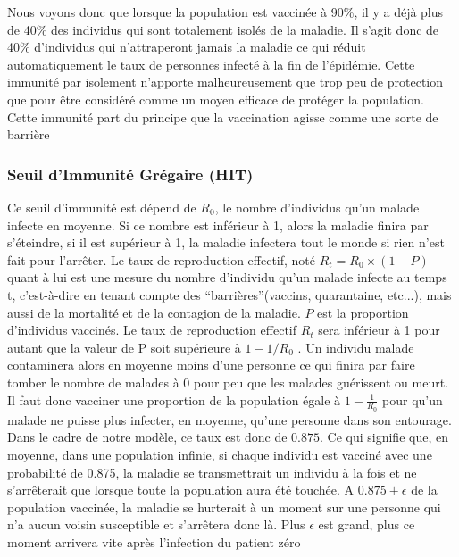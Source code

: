 \documentclass[journal, a4paper]{IEEEtran}
\begin{document}
	Nous voyons donc que lorsque la population est vaccinée à 90\%, il y a déjà plus de 40\% des individus qui sont totalement isolés de la maladie. Il s'agit donc de 40\% d'individus qui n'attraperont jamais la maladie ce qui réduit automatiquement le taux de personnes infecté à la fin de l'épidémie. Cette immunité par isolement n'apporte malheureusement que trop peu de protection que pour être considéré comme un moyen efficace de protéger la population. Cette immunité part du principe que la vaccination agisse comme une sorte de barrière \cite{vaccine_as_barrier}

	\subsubsection{Seuil d'Immunité Grégaire (HIT)}
	Ce seuil d'immunité est dépend de $R_0$, le nombre d'individus qu'un malade infecte en moyenne. Si ce nombre est inférieur à 1, alors la maladie finira par s'éteindre, si il est supérieur à 1, la maladie infectera tout le monde si rien n'est fait pour l'arrêter.
	Le taux de reproduction effectif, noté $R_t = R_0 \times (1-P)$ quant à lui est une mesure du nombre d'individu qu'un malade infecte au temps t, c'est-à-dire en tenant compte des ``barrières''(vaccins, quarantaine, etc...), mais aussi de la mortalité et de la contagion de la maladie. $P$ est la proportion d'individus vaccinés. Le taux de reproduction effectif $R_t$ sera inférieur à 1 pour autant que la valeur de P soit supérieure à $1-1/R_0$ \cite{herd_guide}. Un individu malade contaminera alors en moyenne moins d'une personne ce qui finira par faire tomber le nombre de malades à 0 pour peu que les malades guérissent ou meurt. Il faut donc vacciner une proportion de la population égale à $1-\frac{1}{R_0}$ pour qu'un malade ne puisse plus infecter, en moyenne, qu'une personne dans son entourage.\\
	Dans le cadre de notre modèle, ce taux est donc de $0.875$. Ce qui signifie que, en moyenne, dans une population infinie, si chaque individu est vacciné avec une probabilité de 0.875, la maladie se transmettrait un individu à la fois et ne s'arrêterait que lorsque toute la population aura été touchée. A $0.875+\epsilon$ de la population vaccinée, la maladie se hurterait à un moment sur une personne qui n'a aucun voisin susceptible et s'arrêtera donc là. Plus $\epsilon$ est grand, plus ce moment arrivera vite après l'infection du patient zéro



\end{document}
